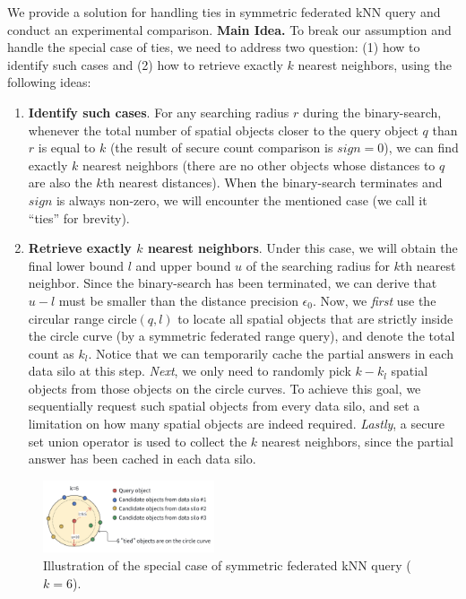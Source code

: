 We provide a solution for handling ties in symmetric federated kNN query and conduct an experimental comparison.
\textbf{Main Idea.} To break our assumption and handle the special case of ties, we need to address two question: (1) how to identify such cases and (2) how to retrieve exactly $k$ nearest neighbors, using the following ideas:
\begin{enumerate}[(1)]
    \item \textbf{Identify such cases}.
    For any searching radius $r$ during the binary-search, whenever the total number of spatial objects closer to the query object $q$ than $r$ is equal to $k$ (\ie the result of secure count comparison is $sign = 0$), we can find exactly $k$ nearest neighbors (\ie there are no other objects whose distances to $q$ are also the $k$th nearest distances).
    When the binary-search terminates and $sign$ is always non-zero, we will encounter the mentioned case (we call it ``ties'' for brevity).
    
    \item \textbf{Retrieve exactly $k$ nearest neighbors}.
    Under this case, we will obtain the final lower bound $l$ and upper bound $u$ of the searching radius for $k$th nearest neighbor.
    Since the binary-search has been terminated, we can derive that $u-l$ must be smaller than the distance precision $\epsilon_0$.
    Now, we \textit{first} use the circular range $\text{circle}(q,l)$ to locate all spatial objects that are strictly inside the circle curve (\ie by a symmetric federated range query), and denote the total count as $k_l$.
    Notice that we can temporarily cache the partial answers in each data silo at this step.
    \textit{Next}, we only need to randomly pick $k-k_l$ spatial objects from those objects on the circle curves.
    To achieve this goal, we sequentially request such spatial objects from every data silo,
    and set a limitation on how many spatial objects are indeed required.
    \textit{Lastly}, a secure set union operator is used to collect the $k$ nearest neighbors, since the partial answer has been cached in each data silo.
\end{enumerate}

\begin{figure}[t]
    \centering
    \includegraphics[width=0.45\textwidth]{apdx/example.pdf}
    \caption{Illustration of the special case of symmetric federated kNN query ($k=6$).}
    \label{fig:special-knn}
\end{figure}

